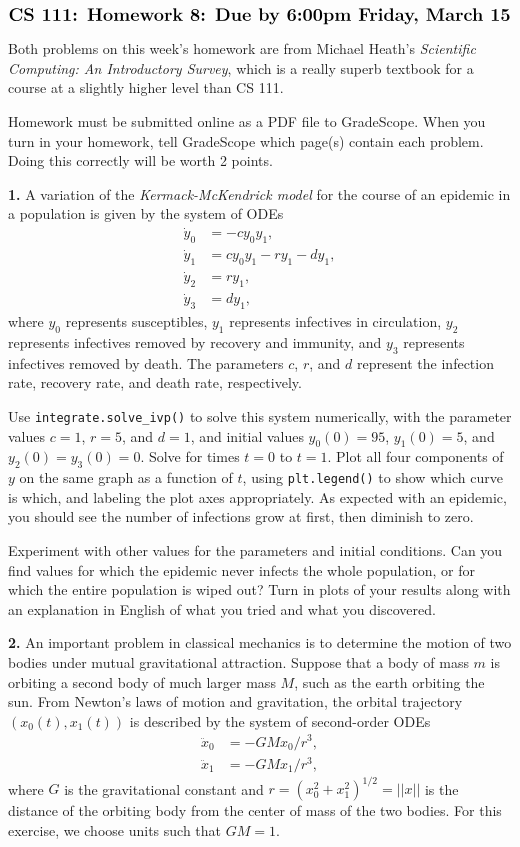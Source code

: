 \documentclass[11pt]{article}
\begin{document}
$$\mbox{\Large \bf CS 111: Homework 8: Due by 6:00pm Friday, March 15}$$
\par\bigskip\noindent
Both problems on this week's homework are from Michael Heath's 
{\em Scientific Computing: An Introductory Survey}, 
which is a really superb textbook for a course at a slightly higher level than CS 111.

\par\smallskip
Homework must be submitted online as a PDF file to GradeScope.
When you turn in your homework, 
tell GradeScope which page(s) contain each problem. 
Doing this correctly will be worth 2 points.

\par\bigskip
{\bf 1.} 
A variation of the {\em Kermack-McKendrick model} 
for the course of an epidemic in a population is given by the system of ODEs
\begin{align}
\dot y_0 &= -cy_0y_1, \\
\dot y_1 &= cy_0y_1 - ry_1 - dy_1, \\
\dot y_2 &= ry_1, \\
\dot y_3 &= dy_1,
\end{align}
where $y_0$ represents susceptibles,
$y_1$ represents infectives in circulation,
$y_2$ represents infectives removed by recovery and immunity,
and $y_3$ represents infectives removed by death.
The parameters $c$, $r$, and $d$ represent the infection rate,
recovery rate, and death rate, respectively.

Use {\tt integrate.solve\_ivp()} to solve this system numerically,
with the parameter values $c=1$, $r=5$, and $d=1$,
and initial values $y_0(0)=95$, $y_1(0)=5$, and $y_2(0)=y_3(0)=0$.
Solve for times $t=0$ to $t=1$.
Plot all four components of $y$ on the same graph as a function of $t$,
using {\tt plt.legend()} to show which curve is which,
and labeling the plot axes appropriately.
As expected with an epidemic, 
you should see the number of infections grow at first,
then diminish to zero.

Experiment with other values for the parameters and initial conditions.
Can you find values for which the epidemic never infects the whole population,
or for which the entire population is wiped out?
Turn in plots of your results along with an explanation in English
of what you tried and what you discovered.

\par\bigskip
{\bf 2.} 
An important problem in classical mechanics is to determine the motion
of two bodies under mutual gravitational attraction.
Suppose that a body of mass $m$ is orbiting a second body of much larger mass $M$,
such as the earth orbiting the sun.
From Newton's laws of motion and gravitation,
the orbital trajectory $(x_0(t), x_1(t))$ is described by the system
of second-order ODEs
\begin{align}
\ddot x_0 &= -GMx_0/r^3, \\
\ddot x_1 &= -GMx_1/r^3, 
\end{align}
where $G$ is the gravitational constant and $r = (x_0^2 + x_1^2)^{1/2} = ||x||$
is the distance of the orbiting body from the center of mass of the two bodies.
For this exercise, we choose units such that $GM=1$.
\end{document}
